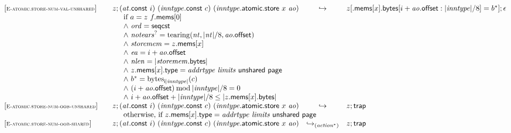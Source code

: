 $$
\begin{array}[t]{@{}lrcl@{}l@{}}
{[\textsc{\scriptsize E{-}atomic.store{-}num{-}val{-}unshared}]} \quad & z ; ({\mathit{at}}{.}\mathsf{const}~i)~({\mathit{inntype}}{.}\mathsf{const}~c)~({\mathit{inntype}}{.}\mathsf{atomic}{.}\mathsf{store}~x~{\mathit{ao}}) & \hookrightarrow & z{}[{.}\mathsf{mems}{}[x]{.}\mathsf{bytes}{}[i + {\mathit{ao}}{.}\mathsf{offset} : {|{\mathit{inntype}}|} / 8] = {b^\ast}] ; \epsilon &  \\
& \multicolumn{4}{@{}l@{}}{\quad
\quad
\begin{array}[t]{@{}l@{}}
\mbox{if}~ a = z~f{.}\mathsf{mems}{}[0] \\
{\land}~ {\mathit{ord}} = \mathsf{seqcst} \\
{\land}~ {{\mathit{notears}}^?} = {\mathrm{tearing}}({\mathit{nt}}, {|{\mathit{nt}}|} / 8, {\mathit{ao}}{.}\mathsf{offset}) \\
{\land}~ {\mathit{storemem}} = z{.}\mathsf{mems}{}[x] \\
{\land}~ {\mathit{ea}} = i + {\mathit{ao}}{.}\mathsf{offset} \\
{\land}~ {\mathit{nlen}} = {|{\mathit{storemem}}{.}\mathsf{bytes}|} \\
{\land}~ z{.}\mathsf{mems}{}[x]{.}\mathsf{type} = {\mathit{addrtype}}~{\mathit{limits}}~\mathsf{unshared}~\mathsf{page} \\
{\land}~ {b^\ast} = {{\mathrm{bytes}}}_{{\mathsf{i}}{{|{\mathit{inntype}}|}}}(c) \\
{\land}~ (i + {\mathit{ao}}{.}\mathsf{offset}) \mathbin{\mathrm{mod}} {|{\mathit{inntype}}|} / 8 = 0 \\
{\land}~ i + {\mathit{ao}}{.}\mathsf{offset} + {|{\mathit{inntype}}|} / 8 \leq {|z{.}\mathsf{mems}{}[x]{.}\mathsf{bytes}|} \\
\end{array}
} \\
{[\textsc{\scriptsize E{-}atomic.store{-}num{-}oob{-}unshared}]} \quad & z ; ({\mathit{at}}{.}\mathsf{const}~i)~({\mathit{inntype}}{.}\mathsf{const}~c)~({\mathit{inntype}}{.}\mathsf{atomic}{.}\mathsf{store}~x~{\mathit{ao}}) & \hookrightarrow & z ; \mathsf{trap} &  \\
& \multicolumn{4}{@{}l@{}}{\quad
\quad \mbox{otherwise, if}~ z{.}\mathsf{mems}{}[x]{.}\mathsf{type} = {\mathit{addrtype}}~{\mathit{limits}}~\mathsf{unshared}~\mathsf{page}
} \\
{[\textsc{\scriptsize E{-}atomic.store{-}num{-}oob{-}shared}]} \quad & z ; ({\mathit{at}}{.}\mathsf{const}~i)~({\mathit{inntype}}{.}\mathsf{const}~c)~({\mathit{inntype}}{.}\mathsf{atomic}{.}\mathsf{store}~x~{\mathit{ao}}) & {\hookrightarrow}_{({{\mathit{action}}^\ast})} {} & z ; \mathsf{trap} &  \\

\end{array}$$
